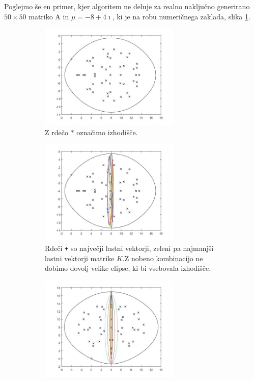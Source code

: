 \documentclass[12pt,a4paper]{amsart}
\theoremstyle{definition}
\theoremstyle{plain}
\begin{document}
Poglejmo še en primer, kjer algoritem ne deluje za realno naključno generirano $50\times 50$ matriko A in $\mu = -8+4\imath$, ki je na robu numeričnega zaklada, slika \ref{fig:p61}.
\begin{figure}[H]
\renewcommand*\thesubfigure{\Alph{subfigure}}
\begin{subfigure}[t]{0.45\textwidth}
\includegraphics[width=0.9\linewidth,height=5cm]{RC4.jpg}
\caption{Z rdečo $\ast$ označimo izhodišče.}
\label{fig:p61}
\end{subfigure}%
\hfill
\begin{subfigure}[t]{0.45\textwidth}
\includegraphics[width=0.9\linewidth,height=5cm]{RC4e1.jpg}
\caption{Rdeči \verb~+~ so največji lastni vektorji, zeleni pa najmanjši lastni vektorji matrike $K$.\footnotemark[\value{footnote}] Z nobeno kombinacijo ne dobimo dovolj velike elipse, ki bi vsebovala izhodišče.}
\label{fig:p62}
\end{subfigure}
\begin{subfigure}[t]{0.45\textwidth}
\includegraphics[width=0.9\linewidth,height=5cm]{RC4e2.jpg}

\end{subfigure}
\end{figure}
\end{document}
